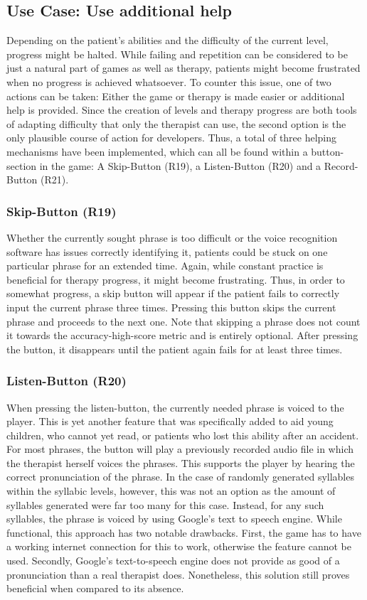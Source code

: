 \documentclass[draft,final]{vutinfth} %
\begin{document}
\subsection{Use Case: Use additional help}
Depending on the patient's abilities and the difficulty of the current level, progress might be halted. While failing and repetition can be considered to be just a natural part of games as well as therapy, patients might become frustrated when no progress is achieved whatsoever. To counter this issue, one of two actions can be taken: Either the game or therapy is made easier or additional help is provided. Since the creation of levels and therapy progress are both tools of adapting difficulty that only the therapist can use, the second option is the only plausible course of action for developers. Thus, a total of three helping mechanisms have been implemented, which can all be found within a button-section in the game: A Skip-Button (R19), a Listen-Button (R20) and a Record-Button (R21).

\subsubsection{Skip-Button (R19)}
Whether the currently sought phrase is too difficult or the voice recognition software has issues correctly identifying it, patients could be stuck on one particular phrase for an extended time. Again, while constant practice is beneficial for therapy progress, it might become frustrating. Thus, in order to somewhat progress, a skip button will appear if the patient fails to correctly input the current phrase three times. Pressing this button skips the current phrase and proceeds to the next one. Note that skipping a phrase does not count it towards the accuracy-high-score metric and is entirely optional. After pressing the button, it disappears until the patient again fails for at least three times.

\subsubsection{Listen-Button (R20)}
When pressing the listen-button, the currently needed phrase is voiced to the player. This is yet another feature that was specifically added to aid young children, who cannot yet read, or patients who lost this ability after an accident. For most phrases, the button will play a previously recorded audio file in which the therapist herself voices the phrases. This supports the player by hearing the correct pronunciation of the phrase. In the case of randomly generated syllables within the syllabic levels, however, this was not an option as the amount of syllables generated were far too many for this case. Instead, for any such syllables, the phrase is voiced by using Google's text to speech engine. While functional, this approach has two notable drawbacks. First, the game has to have a working internet connection for this to work, otherwise the feature cannot be used. Secondly, Google's text-to-speech engine does not provide as good of a pronunciation than a real therapist does. Nonetheless, this solution still proves beneficial when compared to its absence.
\end{document}
